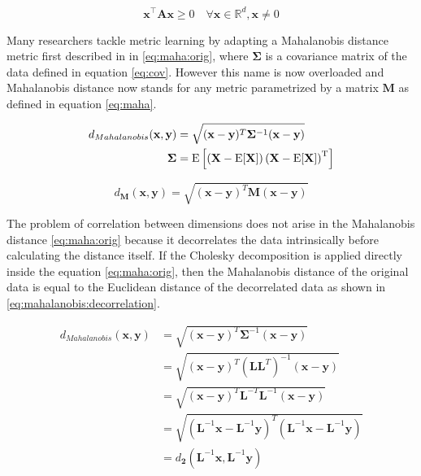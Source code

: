 \documentclass[12pt,a4paper]{report}
\begin{document}
\begin{equation}
\bm{x}^\top \bm{A}\bm{x} \geq 0 \quad \forall \bm{x} \in \mathbb{R}^d, \bm{x} \neq 0 \label{eq:psd:def}
\end{equation}


Many researchers tackle metric learning by adapting a Mahalanobis distance metric first described in \citep{mahalanobis1936generalized} in \ref{eq:maha:orig}, where $\bm{\Sigma}$ is a covariance matrix of the data defined in equation \ref{eq:cov}. However this name is now overloaded and Mahalanobis distance now stands for any metric parametrized by a matrix $\bm{M}$ as defined in equation \ref{eq:maha}.

\begin{align} \label{eq:maha:orig}
d_{Mahalanobis}(\textbf{x},\textbf{y}) &= \sqrt{(\textbf{x}-\textbf{y})^T\bm{\Sigma}^{-1}(\textbf{x}-\textbf{y})}  \\
\bm{\Sigma} &= \mathrm {E} \left[\left(\mathbf {X} -\mathrm {E} [\mathbf {X} ]\right)\left(\mathbf {X} -\mathrm {E} [\mathbf {X} ]\right)^{\rm {T}}\right] \label{eq:cov}
\end{align}

\begin{equation} \label{eq:maha}
d_{\bm{M}}(\textbf{x},\textbf{y}) = \sqrt{(\textbf{x}-\textbf{y})^T\bm{M}(\textbf{x}-\textbf{y})} 
\end{equation}

The problem of correlation between dimensions does not arise in the Mahalanobis distance \eqref{eq:maha:orig} because it decorrelates the data intrinsically before calculating the distance itself. If the Cholesky decomposition is applied directly inside the equation \ref{eq:maha:orig}, then the Mahalanobis distance of the original data is equal to the Euclidean distance of the decorrelated data as shown in \ref{eq:mahalanobis:decorrelation}.

\begin{align}
  d_{Mahalanobis}(\textbf{x},\textbf{y}) &= \sqrt{(\textbf{x}-\textbf{y})^{T}\bm{\Sigma}^{-1}(\textbf{x}-\textbf{y})} \nonumber\\
         &= \sqrt{(\textbf{x}-\textbf{y})^{T}(\bm{L}\bm{L}^{T})^{-1}(\textbf{x}-\textbf{y})} \nonumber\\
         &= \sqrt{(\textbf{x}-\textbf{y})^{T}\bm{L}^{-T}\bm{L}^{-1}(\textbf{x}-\textbf{y})} \nonumber\\
         &= \sqrt{(\bm{L}^{-1}\textbf{x}-\bm{L}^{-1}\textbf{y})^{T}(\bm{L}^{-1}\textbf{x}-\bm{L}^{-1}\textbf{y})} \nonumber\\
         &= d_{\bm{2}}(\bm{L}^{-1}\textbf{x}, \bm{L}^{-1}\textbf{y}) \label{eq:mahalanobis:decorrelation}
\end{align}
\end{document}
